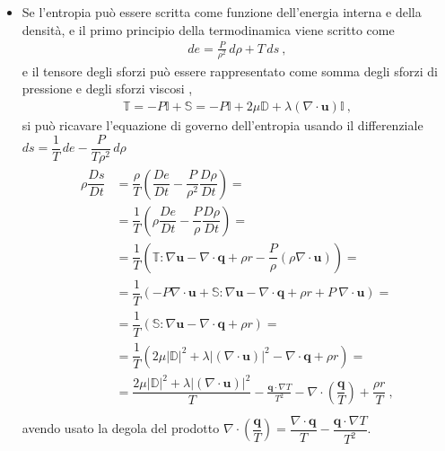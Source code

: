 \documentclass[letterpaper,10pt,english]{jupyterBook}
\begin{document}
\begin{itemize}
\item {} 
\sphinxAtStartPar
{} Se l’entropia può essere scritta come funzione dell’energia interna e della densità, e il primo principio della termodinamica viene scritto come
\begin{equation*}
\begin{split}de = \frac{P}{\rho^2} \, d \rho + T \, ds \ ,\end{split}
\end{equation*}
\sphinxAtStartPar
e il tensore degli sforzi può essere rappresentato come somma degli sforzi di pressione e degli sforzi viscosi  ,
\begin{equation*}
\begin{split}\mathbb{T} = - P \mathbb{I} + \mathbb{S} = - P \mathbb{I} + 2 \mu \mathbb{D} + \lambda (\nabla \cdot \mathbf{u}) \mathbb{I} \ ,\end{split}
\end{equation*}
\sphinxAtStartPar
si può ricavare l’equazione di governo dell’entropia usando il differenziale \(ds = \dfrac{1}{T} \, de - \dfrac{P}{T \rho^2} \, d \rho\)
\begin{equation*}
\begin{split}\begin{aligned}
    \rho \dfrac{D s}{D t} 
    & = \dfrac{\rho}{T} \left( \dfrac{D e }{D t} - \dfrac{P}{\rho^2} \dfrac{D \rho}{D t} \right) = \\
    & = \dfrac{1}{T} \left( \rho \dfrac{D e }{D t} - \dfrac{P}{\rho} \dfrac{D \rho}{D t} \right) = \\
    & = \dfrac{1}{T} \left( \mathbb{T} : \nabla \mathbf{u} - \nabla \cdot \mathbf{q} + \rho r - \dfrac{P}{\rho} \left( \rho \nabla \cdot \mathbf{u} \right) \right) = \\
    & = \dfrac{1}{T} \left( -P \nabla \cdot \mathbf{u} + \mathbb{S} : \nabla \mathbf{u} - \nabla \cdot \mathbf{q} + \rho r + P \ \nabla \cdot \mathbf{u}  \right) = \\
    & = \dfrac{1}{T} \left( \mathbb{S} : \nabla \mathbf{u} - \nabla \cdot \mathbf{q} + \rho r \right) = \\
    & = \dfrac{1}{T} \left( 2 \mu |\mathbb{D}|^2 + \lambda |(\nabla \cdot \mathbf{u})|^2 - \nabla \cdot \mathbf{q} + \rho r \right) = \\
    & = \dfrac{2 \mu |\mathbb{D}|^2 + \lambda |(\nabla \cdot \mathbf{u})|^2 }{T} - \frac{\mathbf{q} \cdot \nabla T}{T^2} - \nabla \cdot \left( \dfrac{\mathbf{q}}{T} \right) + \dfrac{\rho r}{T} \ , \\
  \end{aligned}\end{split}
\end{equation*}
\sphinxAtStartPar
avendo usato la degola del prodotto \(\nabla \cdot \left( \dfrac{\mathbf{q}}{T} \right) = \dfrac{\nabla \cdot \mathbf{q}}{T} - \dfrac{\mathbf{q} \cdot \nabla T}{T^2}\).


\end{itemize}
\end{document}
